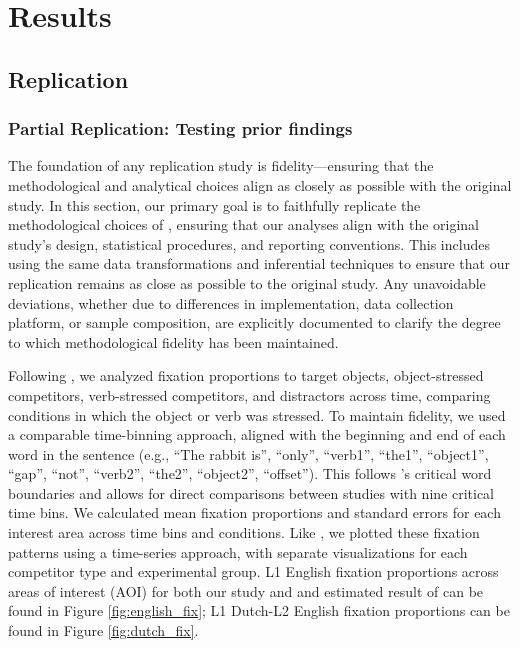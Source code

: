 
\section{Results}
\subsection{Replication}
\subsubsection{Partial Replication: Testing prior findings}

The foundation of any replication study is fidelity—ensuring that the methodological and analytical choices align as closely as possible with the original study. In this section, our primary goal is to faithfully replicate the methodological choices of \textcite{ge2021a}, ensuring that our analyses align with the original study’s design, statistical procedures, and reporting conventions. This includes using the same data transformations and inferential techniques to ensure that our replication remains as close as possible to the original study. Any unavoidable deviations, whether due to differences in implementation, data collection platform, or sample composition, are explicitly documented to clarify the degree to which methodological fidelity has been maintained.

Following \textcite{ge2021a}, we analyzed fixation proportions to target objects, object-stressed competitors, verb-stressed competitors, and distractors across time, comparing conditions in which the object or verb was stressed. To maintain fidelity, we used a comparable time-binning approach, aligned with the beginning and end of each word in the sentence (e.g., “The rabbit is”, “only”, “verb1”, “the1”, “object1”, “gap”, “not”, “verb2”, “the2”, “object2”, “offset”). This follows \textcite{ge2021a}’s critical word boundaries and allows for direct comparisons between studies with nine critical time bins. We calculated mean fixation proportions and standard errors for each interest area across time bins and conditions. Like \textcite{ge2021a}, we plotted these fixation patterns using a time-series approach, with separate visualizations for each competitor type and experimental group. L1 English fixation proportions across areas of interest (AOI) for both our study and and estimated result of \textcite{ge2021a} can be found in Figure \ref{fig:english_fix}; L1 Dutch-L2 English fixation proportions can be found in Figure \ref{fig:dutch_fix}.

